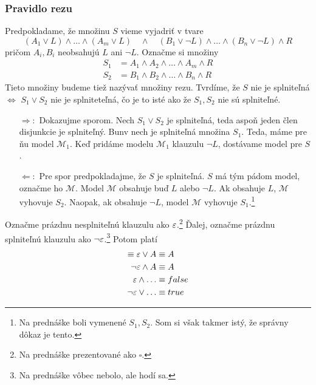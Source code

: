 \subsubsection{Pravidlo rezu}
Predpokladame, že množinu $S$ vieme vyjadriť v tvare
\begin{equation*}
    (A_1 \lor L) \land \ldots \land (A_m \lor L) \quad \land \quad
    (B_1 \lor \neg L) \land \ldots \land (B_n \lor \neg L) \land R
\end{equation*}
pričom $A_i, B_i$ neobsahujú $L$ ani $\neg L$.
Označme si množiny
\begin{align*}
    S_1 &= A_1 \land A_2 \land \ldots \land A_m \land R \\
    S_2 &= B_1 \land B_2 \land \ldots \land B_n \land R
\end{align*}
Tieto množiny budeme tiež nazývať množiny rezu.
Tvrdíme, že $S$ nie je splniteľná $\iff$ $S_1 \lor S_2$ nie je
splniteteľná, čo je to isté ako že $S_1,S_2$ nie sú splniteľné.

\begin{dokaz}
    \begin{itemize}
    \item[$\Rightarrow:$] Dokazujme sporom.
        Nech $S_1 \lor S_2$ je splniteľná, 
        teda aspoň jeden člen disjunkcie je splniteľný.
        Bunv nech je splniteľná množina $S_1$. Teda, máme pre ňu model
        $\mathcal{M}_1$. Keď pridáme modelu $\mathcal{M}_1$ 
        klauzulu $\neg L$, dostávame model pre $S$.

    \item[$\Leftarrow:$] Pre spor predpokladajme, že $S$ je splniteľná.
        $S$ má tým pádom model, označme ho $\mathcal{M}$.
        Model $\mathcal{M}$ obsahuje buď $L$ alebo $\neg L$.
        Ak obsahuje $L$, $\mathcal{M}$ vyhovuje $S_2$. Naopak, ak
        obsahuje $\neg L$, model $\mathcal{M}$ vyhovuje
        $S_1$.\footnote{Na prednáške boli vymenené $S_1,S_2$. Som si
        však takmer istý, že správny dôkaz je tento.}
    \end{itemize}
\end{dokaz}


\begin{definicia}
    Označme prázdnu nesplniteľnú klauzulu ako $\varepsilon$.\footnote{Na
    prednáške prezentované ako $\square$.}
    Ďalej, označme prázdnu splniteľnú klauzulu ako $\neg
    \varepsilon$.\footnote{Na prednáške vôbec nebolo, ale hodí sa.}
    Potom platí
    \begin{align*}
        \equiv \varepsilon \lor A &\equiv A \\
        \neg \varepsilon \land A &\equiv A \\
        \varepsilon \land \dots &\equiv false \\
        \neg \varepsilon \lor \dots &\equiv true
    \end{align*}
\end{definicia}

